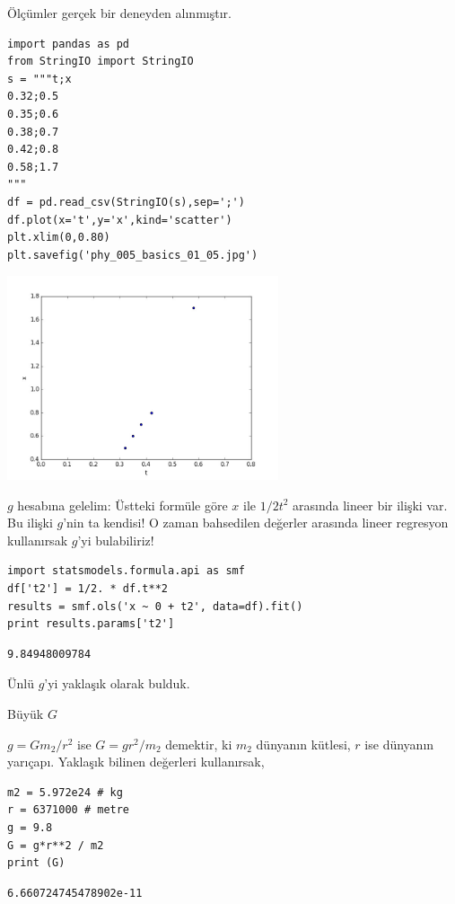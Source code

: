\documentclass[12pt,fleqn]{article}\usepackage{../../common}
\begin{document}
Ölçümler gerçek bir deneyden alınmıştır.

\begin{verbatim}
import pandas as pd
from StringIO import StringIO
s = """t;x
0.32;0.5
0.35;0.6
0.38;0.7
0.42;0.8
0.58;1.7
"""
df = pd.read_csv(StringIO(s),sep=';')
df.plot(x='t',y='x',kind='scatter')
plt.xlim(0,0.80)
plt.savefig('phy_005_basics_01_05.jpg')
\end{verbatim}

\includegraphics[height=6cm]{phy_005_basics_01_05.jpg}

$g$ hesabına gelelim: Üstteki formüle göre $x$ ile $1/2 t^2$ arasında
lineer bir ilişki var. Bu ilişki $g$'nin ta kendisi! O zaman bahsedilen
değerler arasında lineer regresyon kullanırsak $g$'yi bulabiliriz!

\begin{verbatim}
import statsmodels.formula.api as smf
df['t2'] = 1/2. * df.t**2
results = smf.ols('x ~ 0 + t2', data=df).fit()
print results.params['t2']
\end{verbatim}

\begin{verbatim}
9.84948009784
\end{verbatim}

Ünlü $g$'yi yaklaşık olarak bulduk.

Büyük $G$

$g = Gm_2 / r^2$ ise $G = g r^2 / m_2$ demektir, ki $m_2$ dünyanın kütlesi, $r$
ise dünyanın yarıçapı. Yaklaşık bilinen değerleri kullanırsak,

\begin{verbatim}
m2 = 5.972e24 # kg
r = 6371000 # metre
g = 9.8
G = g*r**2 / m2
print (G)
\end{verbatim}

\begin{verbatim}
6.660724745478902e-11
\end{verbatim}
\end{document}
